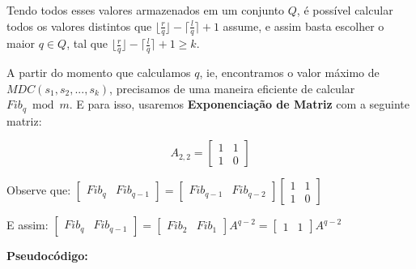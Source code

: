 Tendo todos esses valores armazenados em um conjunto $Q$, é possível calcular todos os valores distintos que $\lfloor \frac{r}{q} \rfloor -\lceil \frac{l}{q} \rceil + 1$ assume, e assim basta escolher o maior $q \in Q$, tal que 
$\lfloor \frac{r}{q} \rfloor -\lceil \frac{l}{q} \rceil + 1 \geq k$.  

A partir do momento que calculamos $q$, ie, encontramos o valor máximo de $MDC(s_1,s_2,...,s_k)$, precisamos de uma maneira eficiente de calcular $Fib_q \bmod m$.
E para isso, usaremos \textbf{Exponenciação de Matriz} com a seguinte matriz:
\newline

\[ A_{2,2} =
\begin{bmatrix}
       1 & 1           \\[0.3em]
       1 & 0
\end{bmatrix}
\]
\newline

Observe que:
$
\begin{bmatrix}
       Fib_q & Fib_{q-1}
\end{bmatrix}
=
\begin{bmatrix}
       Fib_{q-1} & Fib_{q-2}
\end{bmatrix}
\begin{bmatrix}
       1 & 1           \\[0.3em]
       1 & 0
\end{bmatrix}
$
\newline

E assim:
$
\begin{bmatrix}
       Fib_q & Fib_{q-1}
\end{bmatrix}
=
\begin{bmatrix}
       Fib_{2} & Fib_{1}
\end{bmatrix}
A^{q-2}
=
\begin{bmatrix}
       1 & 1
\end{bmatrix}
A^{q-2}
$
\newline
\clearpage

\textbf{Pseudocódigo:}

